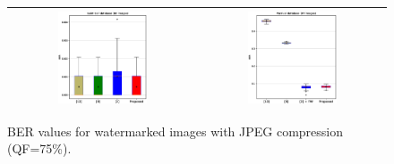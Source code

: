 \documentclass[runningheads]{llncs}
\begin{document}
\begin{figure}[H]
	\begin{center}
		\begin{tabular}{|c|c|}\hline
			\includegraphics[width=0.5\textwidth]{BER75SaintGall.eps}
			&\includegraphics[width=0.5\textwidth]{BER75Parzival.eps}\\\hline
		\end{tabular}
	\end{center}
	\caption{BER values for watermarked images with JPEG compression (QF=75\%).}
	\label{ber75}
\end{figure}
\end{document}
